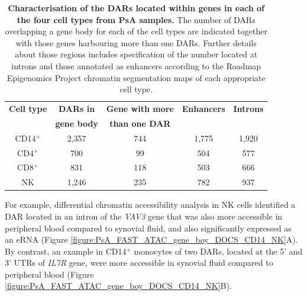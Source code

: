 \begin{table}[htbp]
\centering
\begin{tabular}{@{} c c c c c}
\toprule
\textbf{Cell type} & \textbf{DARs in} &  \textbf{Gene with more}     &\textbf{Enhancers} & \textbf{Introns} \\
                   & \textbf{gene body} &  \textbf{than one DAR} &                   &                   \\
\midrule
\midrule
CD14$^+$ & 2,357 & 744 & 1,775 & 1,920 \\
CD4$^+$ & 700 & 99 & 504 & 577 \\
CD8$^+$ & 831 & 118 & 503 & 666 \\
NK   & 1,246 & 235 & 782 & 937 \\   
\bottomrule
\end{tabular}
\medskip %
\caption[Characterisation of the DARs located within genes in each of the four cell types from PsA samples.]{\textbf{Characterisation of the DARs located within genes in each of the four cell types from PsA samples.} The number of DARs overlapping a gene body for each of the cell types are indicated together with those genes harbouring more than one DARs. Further details about those regions includes specification of the number located at introns and those annotated as enhancers according to the Roadmap Epigenomics Project chromatin segmentation maps of each appropriate cell type.}
\label{tab:PSA_DOCs_gene_body}
\end{table}

For example, differential chromatin accessibility analysis in NK cells identified a DAR located in an intron of the \textit{VAV3} gene that was also more accessible in peripheral blood compared to synovial fluid, and also significantly expressed as an eRNA (Figure \ref{figure:PsA_FAST_ATAC_gene_boy_DOCS_CD14_NK}A). By contrast, an example in CD14$^+$ monocytes of two DARs, located at the 5' and 3' UTRs of \textit{IL7R} gene, were more accessible in synovial fluid compared to peripheral blood (Figure \ref{figure:PsA_FAST_ATAC_gene_boy_DOCS_CD14_NK}B). 


